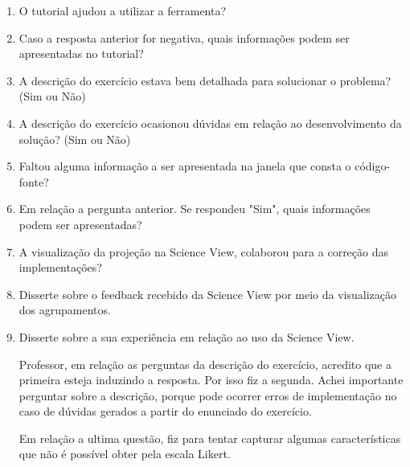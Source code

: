 \begin{enumerate}
	\item O tutorial ajudou a utilizar a ferramenta?
	\item Caso a resposta anterior for negativa, quais informações podem ser apresentadas no tutorial?
	
	\item A descrição do exercício estava bem detalhada para solucionar o problema? (Sim ou Não)
	\item A descrição do exercício ocasionou dúvidas em relação ao desenvolvimento da solução? (Sim ou Não)
	\item Faltou alguma informação a ser apresentada na janela que consta o código-fonte?
	\item Em relação a pergunta anterior. Se respondeu "Sim", quais informações podem ser apresentadas?
	
	\item A visualização da projeção na Science View, colaborou para a correção das implementações?
	\item Disserte sobre o feedback recebido da Science View por meio da visualização dos agrupamentos.
	\item Disserte sobre a sua experiência em relação ao uso da Science View.
	
	Professor, em relação as perguntas da descrição do exercício, acredito que a primeira esteja induzindo a resposta. Por isso fiz a segunda. Achei importante perguntar sobre a descrição, porque pode ocorrer erros de implementação no caso de dúvidas gerados a partir do enunciado do exercício.
	
	Em relação a ultima questão, fiz para tentar capturar algumas características que não é possível obter pela escala Likert.
\end{enumerate}